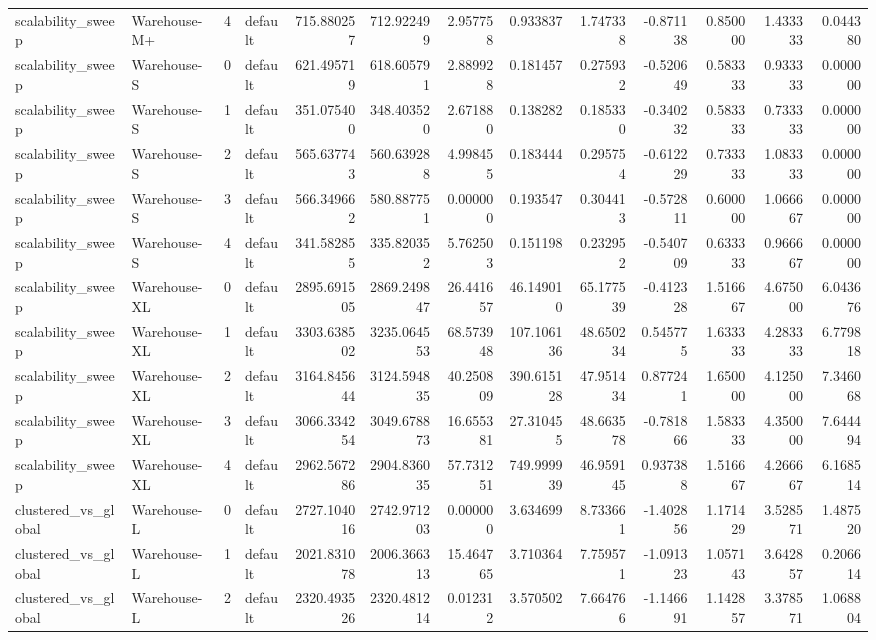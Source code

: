 \begin{tabular}{llrlrrrrrrrrr}
scalability\_sweep & Warehouse-M+ & 4 & default & 715.880257 & 712.922499 & 2.957758 & 0.933837 & 1.747338 & -0.871138 & 0.850000 & 1.433333 & 0.044380 \\
scalability\_sweep & Warehouse-S & 0 & default & 621.495719 & 618.605791 & 2.889928 & 0.181457 & 0.275932 & -0.520649 & 0.583333 & 0.933333 & 0.000000 \\
scalability\_sweep & Warehouse-S & 1 & default & 351.075400 & 348.403520 & 2.671880 & 0.138282 & 0.185330 & -0.340232 & 0.583333 & 0.733333 & 0.000000 \\
scalability\_sweep & Warehouse-S & 2 & default & 565.637743 & 560.639288 & 4.998455 & 0.183444 & 0.295754 & -0.612229 & 0.733333 & 1.083333 & 0.000000 \\
scalability\_sweep & Warehouse-S & 3 & default & 566.349662 & 580.887751 & 0.000000 & 0.193547 & 0.304413 & -0.572811 & 0.600000 & 1.066667 & 0.000000 \\
scalability\_sweep & Warehouse-S & 4 & default & 341.582855 & 335.820352 & 5.762503 & 0.151198 & 0.232952 & -0.540709 & 0.633333 & 0.966667 & 0.000000 \\
scalability\_sweep & Warehouse-XL & 0 & default & 2895.691505 & 2869.249847 & 26.441657 & 46.149010 & 65.177539 & -0.412328 & 1.516667 & 4.675000 & 6.043676 \\
scalability\_sweep & Warehouse-XL & 1 & default & 3303.638502 & 3235.064553 & 68.573948 & 107.106136 & 48.650234 & 0.545775 & 1.633333 & 4.283333 & 6.779818 \\
scalability\_sweep & Warehouse-XL & 2 & default & 3164.845644 & 3124.594835 & 40.250809 & 390.615128 & 47.951434 & 0.877241 & 1.650000 & 4.125000 & 7.346068 \\
scalability\_sweep & Warehouse-XL & 3 & default & 3066.334254 & 3049.678873 & 16.655381 & 27.310455 & 48.663578 & -0.781866 & 1.583333 & 4.350000 & 7.644494 \\
scalability\_sweep & Warehouse-XL & 4 & default & 2962.567286 & 2904.836035 & 57.731251 & 749.999939 & 46.959145 & 0.937388 & 1.516667 & 4.266667 & 6.168514 \\
clustered\_vs\_global & Warehouse-L & 0 & default & 2727.104016 & 2742.971203 & 0.000000 & 3.634699 & 8.733661 & -1.402856 & 1.171429 & 3.528571 & 1.487520 \\
clustered\_vs\_global & Warehouse-L & 1 & default & 2021.831078 & 2006.366313 & 15.464765 & 3.710364 & 7.759571 & -1.091323 & 1.057143 & 3.642857 & 0.206614 \\
clustered\_vs\_global & Warehouse-L & 2 & default & 2320.493526 & 2320.481214 & 0.012312 & 3.570502 & 7.664766 & -1.146691 & 1.142857 & 3.378571 & 1.068804 \\

\end{tabular}
